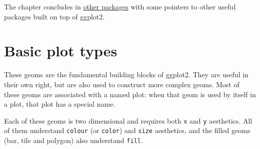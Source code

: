 The chapter concludes in \protect\hyperlink{sec:elsewhere}{other
packages} with some pointers to other useful packages built on top of
ggplot2.

\hypertarget{sec:basics}{\section{Basic plot types}\label{sec:basics}}

These geoms are the fundamental building blocks of ggplot2. They are
useful in their own right, but are also used to construct more complex
geoms. Most of these geoms are associated with a named plot: when that
geom is used by itself in a plot, that plot has a special name.

Each of these geoms is two dimensional and requires both \texttt{x} and
\texttt{y} aesthetics. All of them understand \texttt{colour} (or
\texttt{color}) and \texttt{size} aesthetics, and the filled geoms (bar,
tile and polygon) also understand \texttt{fill}.

